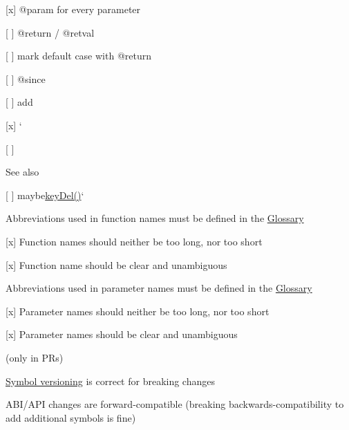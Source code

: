 \begin{DoxyItemize}
\begin{DoxyItemize}
\end{DoxyItemize}
\item \mbox{[}x\mbox{]} {\ttfamily @param} for every parameter
\item \mbox{[} \mbox{]} {\ttfamily @return} / {\ttfamily @retval}
\begin{DoxyItemize}
\item \mbox{[} \mbox{]} mark default case with {\ttfamily @return}
\end{DoxyItemize}
\item \mbox{[} \mbox{]} {\ttfamily @since}
\begin{DoxyItemize}
\item \mbox{[} \mbox{]} add
\end{DoxyItemize}
\item \mbox{[}x\mbox{]} `{\ttfamily }
\item {\ttfamily \mbox{[} \mbox{]}}\begin{DoxySeeAlso}{See also}
{\ttfamily 
\begin{DoxyItemize}
\item \mbox{[} \mbox{]} maybe\hyperlink{group__key_ga3df95bbc2494e3e6703ece5639be5bb1}{key\+Del()}`
\end{DoxyItemize}}
\end{DoxySeeAlso}

\end{DoxyItemize}

{\ttfamily 
\begin{DoxyItemize}
\item Abbreviations used in function names must be defined in the \hyperlink{doc_help_elektra-glossary_md}{Glossary}
\item \mbox{[}x\mbox{]} Function names should neither be too long, nor too short
\item \mbox{[}x\mbox{]} Function name should be clear and unambiguous
\item Abbreviations used in parameter names must be defined in the \hyperlink{doc_help_elektra-glossary_md}{Glossary}
\item \mbox{[}x\mbox{]} Parameter names should neither be too long, nor too short
\item \mbox{[}x\mbox{]} Parameter names should be clear and unambiguous
\end{DoxyItemize}}

{\ttfamily }

{\ttfamily  (only in P\+Rs)}

{\ttfamily 
\begin{DoxyItemize}
\item \hyperlink{doc_dev_symbol-versioning_md}{Symbol versioning} is correct for breaking changes
\item A\+B\+I/\+A\+PI changes are forward-\/compatible (breaking backwards-\/compatibility to add additional symbols is fine)
\end{DoxyItemize}}

